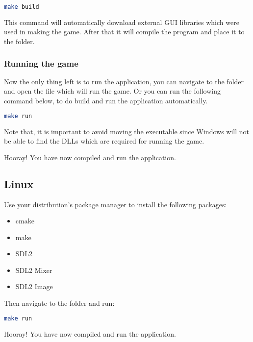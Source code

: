 \begin{lstlisting}[language=bash]
make build
\end{lstlisting}

This command will automatically download external GUI libraries which were used
in making the game. After that it will compile the program and place it to the
 folder.

\subsubsection{Running the game}

Now the only thing left is to run the application, you can navigate to the 
folder and open the  file which will run the game. Or you
can run the following command below, to do build and run the application automatically.

\begin{lstlisting}[language=bash]
make run
\end{lstlisting}

Note that, it is important to avoid moving the executable since Windows will not
be able to find the DLLs which are required for running the game.

Hooray! You have now compiled and run the application.

\subsection{Linux}

Use your distribution’s package manager to install the following packages:

\begin{itemize}
    \item cmake
    \item make
    \item SDL2
    \item SDL2 Mixer
    \item SDL2 Image
\end{itemize}

Then navigate to the  folder and run:

\begin{lstlisting}[language=bash]
make run
\end{lstlisting}

Hooray! You have now compiled and run the application.
